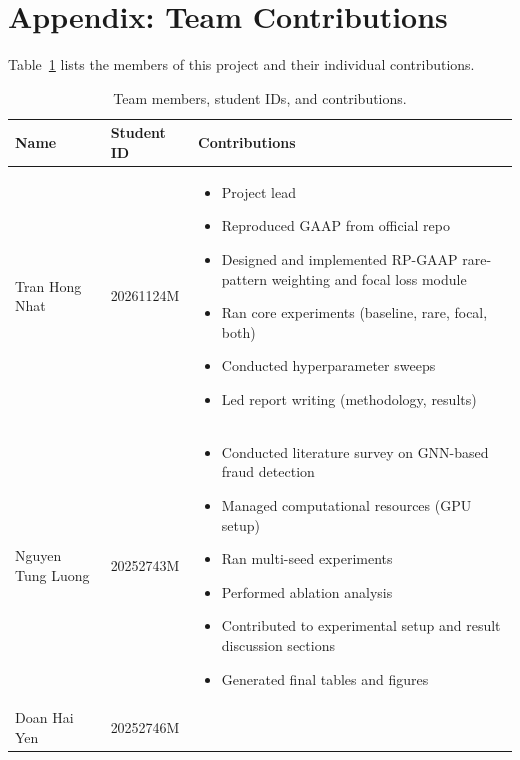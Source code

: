 \section*{Appendix: Team Contributions}

Table~\ref{tab:contributions} lists the members of this project and their individual contributions.

\begin{table}[h]
\centering
\caption{Team members, student IDs, and contributions.}
\label{tab:contributions}
\begin{tabular}{llp{6.5cm}}
\toprule
Name & Student ID & Contributions \\
\midrule
Tran Hong Nhat   & 20261124M & \begin{itemize}[leftmargin=*,nosep]
                           \item Project lead
                           \item Reproduced GAAP from official repo
                           \item Designed and implemented RP-GAAP rare-pattern weighting and focal loss module
                           \item Ran core experiments (baseline, rare, focal, both)
                           \item Conducted hyperparameter sweeps
                           \item Led report writing (methodology, results)
                         \end{itemize} \\
\midrule
Nguyen Tung Luong & 20252743M & \begin{itemize}[leftmargin=*,nosep]
                           \item Conducted literature survey on GNN-based fraud detection
                           \item Managed computational resources (GPU setup)
                           \item Ran multi-seed experiments
                           \item Performed ablation analysis
                           \item Contributed to experimental setup and result discussion sections
                           \item Generated final tables and figures
                         \end{itemize} \\
\midrule
Doan Hai Yen    & 20252746M & \begin{itemize}[leftmargin=*,nosep]

\end{itemize}
\end{tabular}
\end{table}
